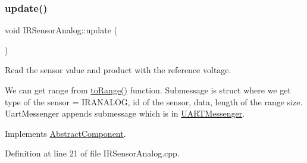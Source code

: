 \mbox{\label{class_i_r_sensor_analog_a919942de7c5fc3af5da9a2b32e31d328}} 
\subsubsection{\texorpdfstring{update()}{update()}}
{\footnotesize\ttfamily void I\+R\+Sensor\+Analog\+::update (\begin{DoxyParamCaption}{ }\end{DoxyParamCaption})\hspace{0.3cm}{\ttfamily [virtual]}}



Read the sensor value and product with the reference voltage. 

We can get range from \hyperlink{class_i_r_sensor_analog_a33ed6c82b3cb6720bfdd6f7598c54699}{to\+Range()} function. Submessage is struct where we get type of the sensor = I\+R\+A\+N\+A\+L\+OG, id of the sensor, data, length of the range size. Uart\+Messenger appends submessage which is in \hyperlink{class_u_a_r_t_messenger}{U\+A\+R\+T\+Messenger}. 

Implements \hyperlink{class_abstract_component_af25a90b8ab213762221c3b358d9873f3}{Abstract\+Component}.



Definition at line 21 of file I\+R\+Sensor\+Analog.\+cpp.


